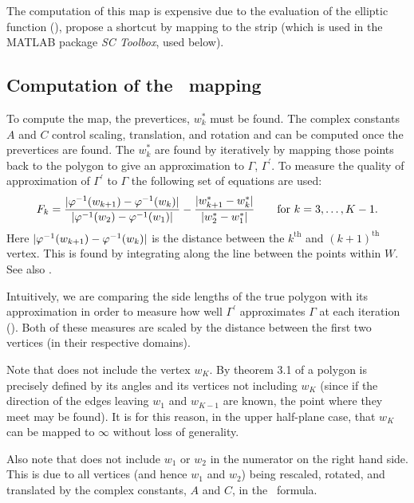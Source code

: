 \label{cor-3s16}The computation of this map is expensive due to the evaluation of the elliptic function (\cite[p. 49]{driscoll}),  propose a shortcut by mapping to the strip (which is used in the MATLAB package \textit{SC Toolbox}, used below).

\subsection{Computation of the \sch\ mapping}
\label{sc-mapping-problem}

To compute the map, the prevertices, $w^*_k$ must be found. The complex constants $A$ and $C$ control scaling, translation, and rotation and can \label{cor-r29-3}be computed once the prevertices are found. The $w^*_k$ are found by iteratively by mapping those points back to the polygon to give an approximation to $\Gamma$, $\Gamma^\prime$. To measure the quality of approximation of $\Gamma^\prime$ to $\Gamma$ the following set of equations are used:
\begin{equation}
\label{optimizeme}
F_k = \frac{\vert \varphi^{-1}(w_{k+1}) -  \varphi^{-1}(w_k) \vert}{\vert \varphi^{-1}(w_2)-\varphi^{-1}(w_1)\vert} - \frac{\vert w^*_{k+1} - w^*_k\vert}{\vert w^*_2 - w^*_1\vert} \qquad \text{for } k=3,\dots,K-1.
\end{equation}
Here $\vert \varphi^{-1}(w_{k+1}) -  \varphi^{-1}(w_k) \vert$ is the distance between the $k^{\text{th}}$ and $(k+1)^{\text{th}}$ vertex. This is found by integrating along the line between the points within $W$. See also .

Intuitively, we are comparing the side lengths of the true polygon with its approximation in order to measure how well $\Gamma^\prime$ approximates $\Gamma$ at each iteration (\cite[A-3]{snider}). Both of these measures are scaled by the distance between the first two vertices (in their respective domains).

Note that  does not include the vertex $w_K$. By theorem 3.1 of \cite[p. 24]{driscoll} a polygon is precisely defined by its angles and its vertices not including $w_K$ (since if the direction of the edges leaving $w_1$ and $w_{K-1}$ are known, the point where they meet may be found). It is for this reason, in the upper half-plane case, that $w_K$ can be mapped to $\infty$ without loss of generality.

Also note that  does not include $w_1$ or $w_2$ in the numerator on the right hand side. This is due to all vertices (and hence $w_1$ and $w_2$) being rescaled, rotated, and translated by the complex constants, $A$ and $C$, in the \sch\ formula.

